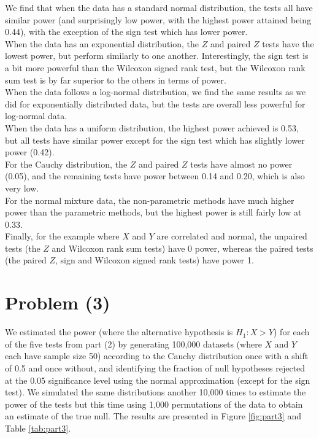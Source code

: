 \documentclass[11pt]{article}
\begin{document}
\noindent We find that when the data has a standard normal distribution, the tests all have similar power (and surprisingly low power, with the highest power attained being 0.44), with the exception of the sign test which has lower power.\\
 When the data has an exponential distribution, the $Z$ and paired $Z$ tests have the lowest power, but perform similarly to one another. Interestingly, the sign test is a bit more powerful than the Wilcoxon signed rank test, but the Wilcoxon rank sum test is by far superior to the others in terms of power. \\
 When the data follows a log-normal distribution, we find the same results as we did for exponentially distributed data, but the tests are overall less powerful for log-normal data.\\
  When the data has a uniform distribution, the highest power achieved is 0.53, but all tests have similar power except for the sign test which has slightly lower power (0.42).\\ 
  For the Cauchy distribution, the $Z$ and paired $Z$ tests have almost no power (0.05), and the remaining tests have power between 0.14 and 0.20, which is also very low. \\
  For the normal mixture data, the non-parametric methods have much higher power than the parametric methods, but the highest power is still fairly low at 0.33.\\
  Finally, for the example where $X$ and $Y$ are correlated and normal, the unpaired tests (the $Z$ and Wilcoxon rank sum tests) have 0 power, whereas the paired tests (the paired $Z$, sign and Wilcoxon signed rank tests) have power 1.

\newpage
\section*{Problem (3)}
We estimated the power (where the alternative hypothesis is $H_1: X > Y$) for each of the five tests from part (2) by generating 100,000 datasets (where $X$ and $Y$ each have sample size 50) according to the Cauchy distribution once with a shift of 0.5 and once without, and identifying the fraction of null hypotheses rejected at the 0.05 significance level using the normal approximation (except for the sign test). We simulated the same distributions another 10,000 times to estimate the power of the tests but this time using 1,000 permutations of the data to obtain an estimate of the true null.  The results are presented in Figure \ref{fig:part3} and Table \ref{tab:part3}.
\end{document}
